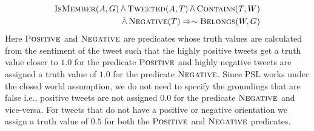 \begin{align*}
\begin{split}
\textsc{IsMember}(A,G) 
	\softand \textsc{Tweeted}(A,T)
	\softand \textsc{Contains}(T,W)\\
	\softand \textsc{Negative}(T)
	\Rightarrow \sim \textsc{Belongs}(W,G)
\end{split}
\end{align*}
Here $\textsc{Positive}$ and $\textsc{Negative}$ are predicates whose truth values are calculated from the sentiment of the tweet such that the highly positive tweets get a truth value closer to $1.0$ for the predicate $\textsc{Positive}$ and highly negative tweets are assigned a truth value of $1.0$ for the predicate $\textsc{Negative}$. 
Since PSL works under the closed world assumption, we do not need to specify the groundings that are false i.e., positive tweets are not assigned $0.0$ for the predicate $\textsc{Negative}$ and vice-versa.
For tweets that do not have a positive or negative orientation we assign a truth value of $0.5$ for both the $\textsc{Positive}$ and $\textsc{Negative}$ predicates.
